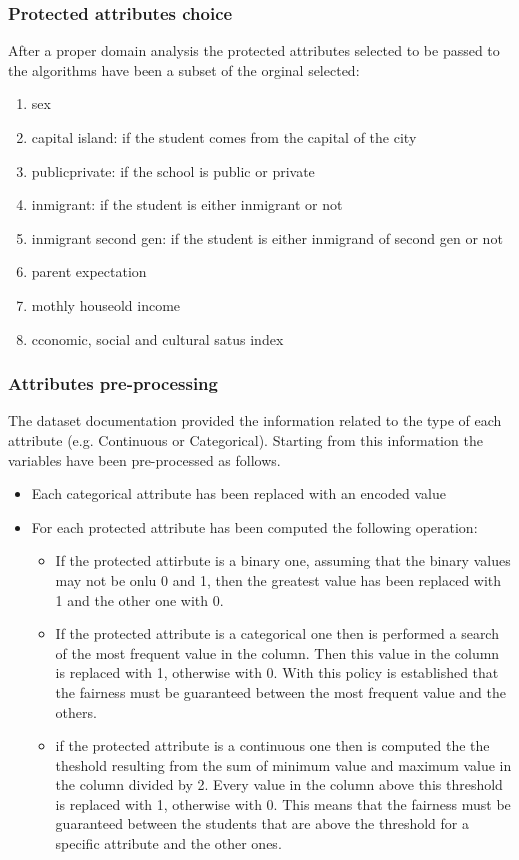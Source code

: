 \documentclass[12pt,a4paper,openright,twoside]{book}
\begin{document}
\subsubsection{Protected attributes choice}
After a proper domain analysis the protected attributes selected to be passed to the algorithms have been a subset of the orginal selected:
\begin{enumerate}
    \item sex
    \item capital island: if the student comes from the capital of the city
    \item public\textunderscore private: if the school is public or private
    \item inmigrant: if the student is either inmigrant or not
    \item inmigrant second gen: if the student is either inmigrand of second gen or not
    \item parent expectation
    \item mothly houseold income
    \item cconomic, social and cultural satus index
\end{enumerate}
\subsubsection{Attributes pre-processing}
The dataset documentation provided the information related to the type of each attribute (e.g. Continuous or Categorical). Starting from this information the variables have been pre-processed as follows.
\begin{itemize}
    \item Each categorical attribute has been replaced with an encoded value
    \item For each protected attribute has been computed the following operation:
    \begin{itemize}
        \item If the protected attirbute is a binary one, assuming that the binary values may not be onlu 0 and 1, then the greatest value has been replaced with 1 and the other one with 0.
        \item If the protected attribute is a categorical one then is performed a search of the most frequent value in the column. Then this value in the column is replaced with 1, otherwise with 0. With this policy is established that the fairness must be guaranteed between the most frequent value and the others.
        \item if the protected attribute is a continuous one then is computed the the theshold resulting from the sum of minimum value and maximum value in the column divided by 2. Every value in the column above this threshold is replaced with 1, otherwise with 0. This means that the fairness must be guaranteed between the students that are above the threshold for a specific attribute and the other ones.
    \end{itemize}
\end{itemize}
\end{document}
